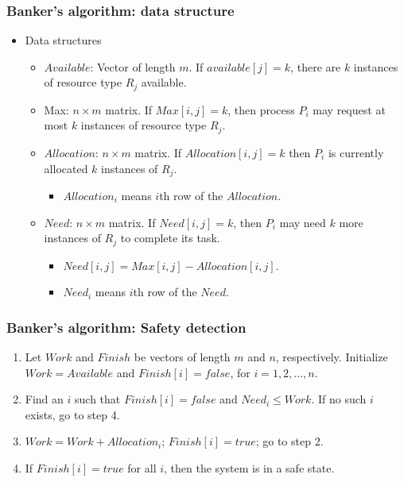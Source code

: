 \documentclass[CJKutf8,dvipsnames,table]{beamer}
\begin{document}
\begin{CJK*}{UTF8}{song}
\begin{frame}
\begin{itemize}
  \end{itemize}
  \end{frame}

  \begin{frame}
  \frametitle{Banker's algorithm: data structure} \pause
  \begin{itemize}
  \item Data structures  \pause
    \begin{itemize}
    \item $Available$:  Vector of length $m$. If $available[j] = k$, there are $k$ instances of resource type $R_j$ available.  \pause
    \item Max: $n \times m$ matrix.  If $Max[i,j] = k$, then process $P_i$ may request at most $k$ instances of resource type $R_j$.  \pause
    \item $Allocation$:  $n \times m$ matrix.  If $Allocation[i,j] = k$ then $P_i$ is currently allocated $k$ instances of $R_j$.  \pause
      \begin{itemize}
      \item $Allocation_i$ means $i$th row of the $Allocation$.  \pause
      \end{itemize}
    \item $Need$:  $n \times m$ matrix. If $Need[i,j] = k$, then $P_i$ may need $k$ more instances of $R_j$ to complete its task.  \pause
      \begin{itemize}
      \item $Need[i,j] = Max[i,j] - Allocation [i,j]$.  \pause
      \item $Need_i$ means $i$th row of the $Need$.
      \end{itemize}
    \end{itemize}
  \end{itemize}
  \end{frame}

  \begin{frame}
  \frametitle{Banker's algorithm: Safety detection} \pause
  \begin{enumerate}
  \item Let $Work$ and $Finish$ be vectors of length $m$ and $n$, respectively. Initialize $Work = Available$ and $Finish[i] = false$, for $i=1, 2, ..., n$.  \pause
  \item{Find an $i$ such that \pause
      \newline
      $Finish[i] = false$ and $Need_i \leq Work$. \pause
      \newline
      If no such $i$ exists, go to step 4. \pause
    }
  \item $Work = Work + Allocation_i$; $Finish[i] = true$; \newline go to step 2.  \pause
  \item If $Finish[i] = true$ for all $i$, then the system is in a safe state.  \pause
  \end{enumerate}
  \end{frame}


\end{CJK*}
\end{document}
